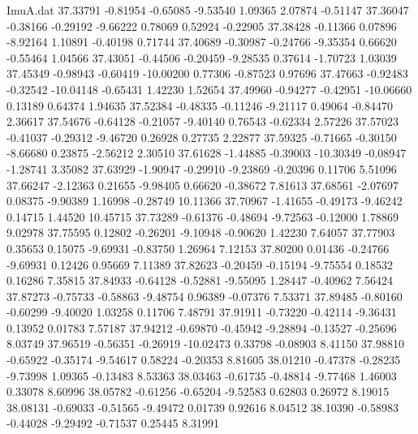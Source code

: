 \begin{filecontents}{ImuA.dat}
  37.33791   -0.81954   -0.65085   -9.53540    1.09365    2.07874   -0.51147
  37.36047   -0.38166   -0.29192   -9.66222    0.78069    0.52924   -0.22905
  37.38428   -0.11366    0.07896   -8.92164    1.10891   -0.40198    0.71744
  37.40689   -0.30987   -0.24766   -9.35354    0.66620   -0.55464    1.04566
  37.43051   -0.44506   -0.20459   -9.28535    0.37614   -1.70723    1.03039
  37.45349   -0.98943   -0.60419  -10.00200    0.77306   -0.87523    0.97696
  37.47663   -0.92483   -0.32542  -10.04148   -0.65431    1.42230    1.52654
  37.49960   -0.94277   -0.42951  -10.06660    0.13189    0.64374    1.94635
  37.52384   -0.48335   -0.11246   -9.21117    0.49064   -0.84470    2.36617
  37.54676   -0.64128   -0.21057   -9.40140    0.76543   -0.62334    2.57226
  37.57023   -0.41037   -0.29312   -9.46720    0.26928    0.27735    2.22877
  37.59325   -0.71665   -0.30150   -8.66680    0.23875   -2.56212    2.30510
  37.61628   -1.44885   -0.39003  -10.30349   -0.08947   -1.28741    3.35082
  37.63929   -1.90947   -0.29910   -9.23869   -0.20396    0.11706    5.51096
  37.66247   -2.12363    0.21655   -9.98405    0.66620   -0.38672    7.81613
  37.68561   -2.07697    0.08375   -9.90389    1.16998   -0.28749   10.11366
  37.70967   -1.41655   -0.49173   -9.46242    0.14715    1.44520   10.45715
  37.73289   -0.61376   -0.48694   -9.72563   -0.12000    1.78869    9.02978
  37.75595    0.12802   -0.26201   -9.10948   -0.90620    1.42230    7.64057
  37.77903    0.35653    0.15075   -9.69931   -0.83750    1.26964    7.12153
  37.80200    0.01436   -0.24766   -9.69931    0.12426    0.95669    7.11389
  37.82623   -0.20459   -0.15194   -9.75554    0.18532    0.16286    7.35815
  37.84933   -0.64128   -0.52881   -9.55095    1.28447   -0.40962    7.56424
  37.87273   -0.75733   -0.58863   -9.48754    0.96389   -0.07376    7.53371
  37.89485   -0.80160   -0.60299   -9.40020    1.03258    0.11706    7.48791
  37.91911   -0.73220   -0.42114   -9.36431    0.13952    0.01783    7.57187
  37.94212   -0.69870   -0.45942   -9.28894   -0.13527   -0.25696    8.03749
  37.96519   -0.56351   -0.26919  -10.02473    0.33798   -0.08903    8.41150
  37.98810   -0.65922   -0.35174   -9.54617    0.58224   -0.20353    8.81605
  38.01210   -0.47378   -0.28235   -9.73998    1.09365   -0.13483    8.53363
  38.03463   -0.61735   -0.48814   -9.77468    1.46003    0.33078    8.60996
  38.05782   -0.61256   -0.65204   -9.52583    0.62803    0.26972    8.19015
  38.08131   -0.69033   -0.51565   -9.49472    0.01739    0.92616    8.04512
  38.10390   -0.58983   -0.44028   -9.29492   -0.71537    0.25445    8.31991

\end{filecontents}
